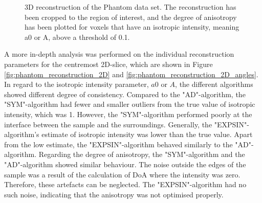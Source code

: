 \begin{figure}[h!]
    
    \caption[3D Reconstructions of Phantom Data Set]{ 3D reconstruction of the Phantom data set.
        The reconstruction has been cropped to the region of interest,
        and the degree of anisotropy has been plotted for voxels that have an isotropic intensity, meaning a0 or A, above a threshold of 0.1. }
    \label{fig:phantom_reconstruction_3D}
\end{figure}

\clearpage
A more in-depth analysis was performed on
the individual reconstruction parameters for the centremost 2D-slice, which are shown in Figure \ref{fig:phantom_reconstruction_2D} and \ref{fig:phantom_reconstruction_2D_angles}. %
In regard to the isotropic intensity parameter, $a0$ or $A$, the different algorithms showed different degree of consistency.
Compared to the "AD"-algorithm, the "SYM"-algorithm had fewer and smaller outliers from the true value of isotropic intensity, which was 1.
However, the "SYM"-algorithm performed poorly at the interface between the sample and the surroundings.
Generally, the "EXPSIN"-algorithm's estimate of isotropic intensity was lower than the true value.
Apart from the low estimate, the "EXPSIN"-algorithm behaved similarly to the "AD"-algorithm.
Regarding the degree of anisotropy, the "SYM"-algorithm and the "AD"-algorithm showed similar behaviour.
The noise outside the edges of the sample was a result of the calculation of DoA where the intensity was zero.
Therefore, these artefacts can be neglected.
The "EXPSIN"-algorithm had no such noise, indicating that the anisotropy was not optimised properly.



